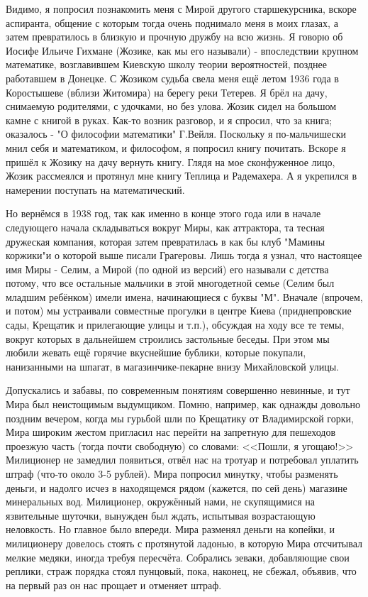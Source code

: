 Видимо, я попросил познакомить меня с Мирой другого старшекурсника, вскоре аспиранта, общение с которым тогда очень поднимало меня в моих глазах, а затем превратилось в близкую и прочную дружбу на всю жизнь. Я говорю об Иосифе Ильиче Гихмане (Жозике, как мы его называли) - впоследствии крупном математике, возглавившем Киевскую школу теории вероятностей, позднее работавшем в Донецке. С Жозиком судьба свела меня ещё летом 1936 года в Коростышеве (вблизи Житомира) на берегу реки Тетерев. Я брёл на дачу, снимаемую родителями, с удочками, но без улова. Жозик сидел на большом камне с книгой в руках. Как-то возник разговор, и я спросил, что за книга; оказалось - "О философии математики" Г.Вейля. Поскольку я по-мальчишески мнил себя и математиком, и философом, я попросил книгу почитать. Вскоре я пришёл к Жозику на дачу вернуть книгу. Глядя на мое сконфуженное лицо, Жозик рассмеялся и протянул мне книгу Теплица и Радемахера. А я укрепился в намерении поступать на математический.

Но вернёмся в 1938 год, так как именно в конце этого года или в начале следующего начала складываться вокруг Миры, как аттрактора, та тесная дружеская компания, которая затем превратилась в как бы клуб "Мамины коржики"и о которой выше писали Грагеровы. Лишь тогда я узнал, что настоящее имя Миры - Селим, а Мирой (по одной из версий) его называли с детства потому, что все остальные мальчики в этой многодетной семье (Селим был младшим ребёнком) имели имена, начинающиеся с буквы "М". Вначале (впрочем, и потом) мы устраивали совместные прогулки в центре Киева (приднепровские сады, Крещатик и прилегающие улицы и т.п.), обсуждая на ходу все те темы, вокруг которых в дальнейшем строились застольные беседы. При этом мы любили жевать ещё горячие вкуснейшие бублики, которые покупали, нанизанными на шпагат, в магазинчике-пекарне внизу Михайловской улицы.

Допускались и забавы, по современным понятиям совершенно невинные,
и тут Мира был неистощимым выдумщиком.
Помню, например, как однажды довольно поздним вечером, когда мы гурьбой шли по Крещатику от Владимирской горки,
Мира широким жестом пригласил нас перейти на запретную для пешеходов проезжую часть
(тогда почти свободную) со словами: <<Пошли, я угощаю!>>
Милиционер не замедлил появиться, отвёл нас на тротуар и потребовал уплатить штраф (что-то около 3-5 рублей).
Мира попросил минутку, чтобы разменять деньги, и надолго исчез в находящемся рядом (кажется, по сей день)
магазине минеральных вод. Милиционер, окружённый нами, не скупящимися на язвительные шуточки,
вынужден был ждать, испытывая возрастающую неловкость.
Но главное было впереди. Мира разменял деньги на копейки, и милиционеру довелось стоять с протянутой ладонью, в которую Мира отсчитывал мелкие медяки, иногда требуя пересчёта. Собрались зеваки, добавляющие свои реплики, страж порядка стоял пунцовый, пока, наконец, не сбежал, объявив, что на первый раз он нас прощает и отменяет штраф.

